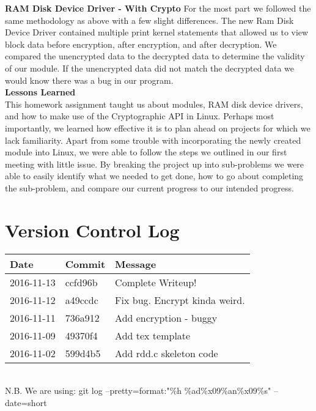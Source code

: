 \documentclass[letterpaper,10pt,draftclsnofoot,titlepage,onecolumn]{IEEEtran}
\begin{document}
 		\textbf{RAM Disk Device Driver - With Crypto}
 		For the most part we followed the same methodology as above with a few slight differences. 
 		The new Ram Disk Device Driver contained multiple print kernel statements that allowed us to view block data before encryption, after encryption, and after decryption. 
 		We compared the unencrypted data to the decrypted data to determine the validity of our module. 
 		If the unencrypted data did not match the decrypted data we would know there was a bug in our program. 
 		\\ 
	\textbf{Lessons Learned}\\
This homework assignment taught us about modules, RAM disk device drivers, and how to make use of the Cryptographic API in Linux. 
Perhaps most importantly, we learned how effective it is to plan ahead on projects for which we lack familiarity. 
Apart from some trouble with incorporating the newly created module into Linux, we were able to follow the steps we outlined in our first meeting with little issue. 
By breaking the project up into sub-problems we were able to easily identify what we needed to get done, how to go about completing the sub-problem, and compare our current progress to our intended progress.
		\\

	\clearpage

	\section{Version Control Log}
	
\begin{center}

\begin{tabular}{| m{2cm} | m{8cm} | m{4cm} | } 
\hline
 Date & Commit & Message \\ [0.5ex] 
 \hline\hline
2016-11-13 & ccfd96b & Complete Writeup! \\
 \hline 
  2016-11-12 & a49ccdc & Fix bug. Encrypt kinda weird. \\
 \hline
  2016-11-11 & 736a912 & Add encryption - buggy \\
 \hline
  2016-11-09 & 49370f4 & Add tex template \\
 \hline
   2016-11-02 & 599d4b5 & Add rdd.c skeleton code \\
 \hline
 
\end{tabular}

\end{center}
\hfill\\
N.B. We are using: git log --pretty=format:"\%h \%ad\%x09\%an\%x09\%s" --date=short
	
\end{document}
